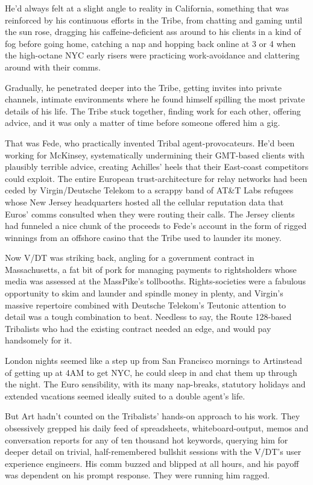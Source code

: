 He’d always felt at a slight angle to reality in California,
something that was reinforced by his continuous efforts in the
Tribe, from chatting and gaming until the sun rose, dragging his
caffeine-deficient ass around to his clients in a kind of fog
before going home, catching a nap and hopping back online at 3 or 4
when the high-octane NYC early risers were practicing
work-avoidance and clattering around with their comms.

Gradually, he penetrated deeper into the Tribe, getting invites
into private channels, intimate environments where he found himself
spilling the most private details of his life. The Tribe stuck
together, finding work for each other, offering advice, and it was
only a matter of time before someone offered him a gig.

That was Fede, who practically invented Tribal agent-pro\-vo\-ca\-teurs.
He’d been working for McKinsey, systematically undermining their
GMT-based clients with plausibly terrible advice, creating
Achilles’ heels that their East-coast competitors could exploit.
The entire European trust-architecture for relay networks had been
ceded by Virgin/Deutsche Telekom to a scrappy band of AT\&T Labs
refugees whose New Jersey headquarters hosted all the cellular
reputation data that Euros’ comms consulted when they were routing
their calls. The Jersey clients had funneled a nice chunk of the
proceeds to Fede’s account in the form of rigged winnings from an
offshore casino that the Tribe used to launder its money.

Now V/DT was striking back, angling for a government contract in
Massachusetts, a fat bit of pork for managing payments to
rightsholders whose media was assessed at the MassPike’s
tollbooths. Rights-societies were a fabulous opportunity to skim
and launder and spindle money in plenty, and Virgin’s massive
repertoire combined with Deutsche Telekom’s Teutonic attention to
detail was a tough combination to beat. Needless to say, the Route
128-based Tribalists who had the existing contract needed an edge,
and would pay handsomely for it.

London nights seemed like a step up from San Francisco mornings to
Art{\dash}instead of getting up at 4AM to get NYC, he could sleep in and
chat them up through the night. The Euro sensibility, with its many
nap-breaks, statutory holidays and extended vacations seemed
ideally suited to a double agent’s life.

But Art hadn’t counted on the Tribalists’ hands-on approach to his
work. They obsessively grepped his daily feed of spreadsheets,
whiteboard-output, memos and conversation reports for any of ten
thousand hot keywords, querying him for deeper detail on trivial,
half-remembered bullshit sessions with the V/DT’s user experience
engineers. His comm buzzed and blipped at all hours, and his payoff
was dependent on his prompt response. They were running him
ragged.


